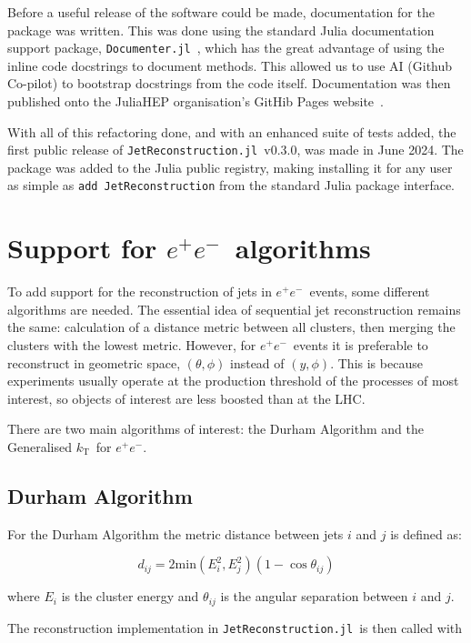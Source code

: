 \documentclass{webofc}
\newcommand{\kt}{${k}_\text{T}$}
\newcommand{\JR}{\texttt{JetReconstruction.jl}}
\newcommand{\ee}{$e^+e^-$}
\begin{document}
Before a useful release of the software could be made, documentation for the
package was written. This was done using the standard Julia documentation
support package, \texttt{Documenter.jl}~\cite{documenter-jl}, which has the
great advantage of using the inline code docstrings to document methods. This
allowed us to use AI (Github Co-pilot) to bootstrap docstrings from the code
itself. Documentation was then published onto the JuliaHEP organisation's
GitHib Pages website~\cite{jetreco-docs}.

With all of this refactoring done, and with an enhanced suite of tests added,
the first public release of \JR\, v0.3.0, was made in June 2024. The package was
added to the Julia public registry, making installing it for any user as simple
as \texttt{add JetReconstruction} from the standard Julia package interface.

\section{Support for \ee\ algorithms}
\label{sec:ee}

To add support for the reconstruction of jets in \ee\ events, some different
algorithms are needed. The essential idea of sequential jet reconstruction
remains the same: calculation of a distance metric between all clusters, then
merging the clusters with the lowest metric. However, for \ee\ events it is
preferable to reconstruct in geometric space, $(\theta, \phi)$ instead of $(y,
\phi)$. This is because experiments usually operate at the production threshold
of the processes of most interest, so objects of interest are less boosted than
at the LHC.

There are two main algorithms of interest: the Durham Algorithm and the Generalised \kt\ for \ee.

\subsection{Durham Algorithm}
\label{sec:durham}

For the Durham Algorithm the metric distance between jets $i$ and $j$ is defined as:

$$
d_{ij} = 2 \text{min}(E_i^2, E_j^2) (1 - \cos \theta_{ij})
$$

where $E_{i}$ is the cluster energy and $\theta_{ij}$ is the angular separation between $i$ and $j$.

The reconstruction implementation in \JR\ is then called with
\end{document}
